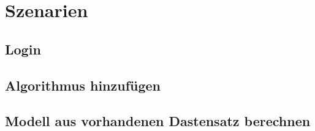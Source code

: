 \section{Szenarien} %
\subsection{Login}

\pagebreak
\subsection{Algorithmus hinzufügen}


\subsection{Modell aus vorhandenen Dastensatz berechnen}
